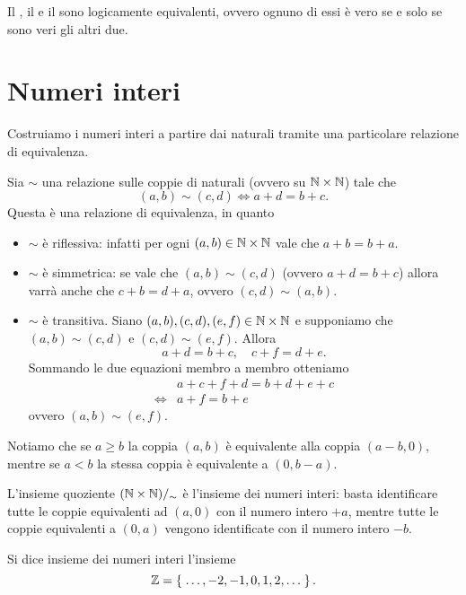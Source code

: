 \begin{remark}
    Il , il  e il  sono logicamente equivalenti, ovvero ognuno di essi è vero se e solo se sono veri gli altri due.
\end{remark}

\section{Numeri interi}

Costruiamo i numeri interi a partire dai naturali tramite una particolare relazione di equivalenza.

Sia $\sim$ una relazione sulle coppie di naturali (ovvero su $\mathbb{N} \times \mathbb{N}$) tale che \[
    (a, b) \sim (c, d) \iff a + d = b + c.
\]
Questa è una relazione di equivalenza, in quanto \begin{itemize}
    \item $\sim$ è riflessiva: infatti per ogni $(a, b) \in \mathbb{N} \times \mathbb{N}$ vale che $a + b = b + a$.
    \item $\sim$ è simmetrica: se vale che $(a, b) \sim (c, d)$ (ovvero $a + d = b + c$) allora varrà anche che $c + b = d + a$, ovvero $(c, d) \sim (a, b)$.
    \item $\sim$ è transitiva. Siano $(a, b), (c, d), (e, f) \in \mathbb{N} \times \mathbb{N}$ e supponiamo che $(a, b) \sim (c, d)$ e $(c, d) \sim (e, f)$. Allora \[
        a + d = b + c, \quad c + f = d + e.    
    \] Sommando le due equazioni membro a membro otteniamo \begin{align*}
        &a + c + f + d = b + d + e + c \\
        \iff &a + f = b + e  
    \end{align*} ovvero $(a, b) \sim (e, f)$.
\end{itemize}

Notiamo che se $a \geq b$ la coppia $(a, b)$ è equivalente alla coppia $(a-b, 0)$, mentre se $a < b$ la stessa coppia è equivalente a $(0, b-a)$.

L'insieme quoziente $(\mathbb{N} \times \mathbb{N})/_{\sim}$ è l'insieme dei numeri interi: basta identificare tutte le coppie equivalenti ad $(a, 0)$ con il numero intero $+a$, mentre tutte le coppie equivalenti a $(0, a)$ vengono identificate con il numero intero $-b$.

\begin{definition}
    Si dice insieme dei numeri interi l'insieme \[
        \mathbb{Z} = \left\{\;\dots, -2, -1, 0, 1, 2, \dots\;\right\}.    
    \]
\end{definition}

